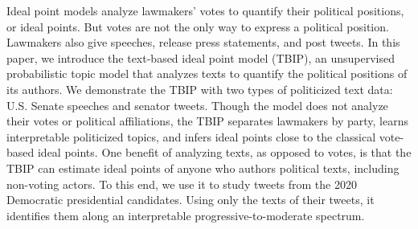 Ideal point models analyze lawmakers' votes to quantify their political positions, or ideal points. But votes are not the only way to express a political position. Lawmakers also give speeches, release press statements, and post tweets. In this paper, we introduce the text-based ideal point model (TBIP), an unsupervised probabilistic topic model that analyzes texts to quantify the political positions of its authors. We demonstrate the TBIP with two types of politicized text data: U.S. Senate speeches and senator tweets. Though the model does not analyze their votes or political affiliations, the TBIP separates lawmakers by party, learns interpretable politicized topics, and infers ideal points close to the classical vote-based ideal points. One benefit of analyzing texts, as opposed to votes, is that the TBIP can estimate ideal points of anyone who authors political texts, including non-voting actors. To this end, we use it to study tweets from the 2020 Democratic presidential candidates. Using only the texts of their tweets, it identifies them along an interpretable progressive-to-moderate spectrum.
